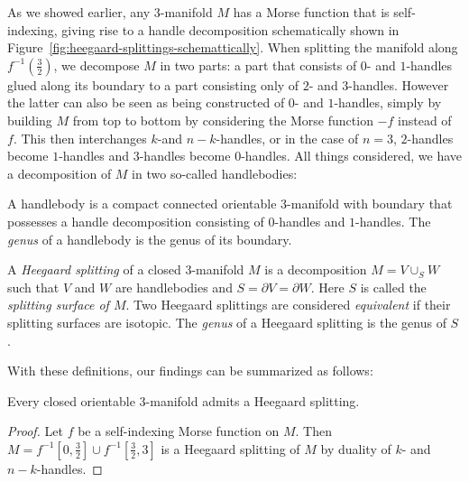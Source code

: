 As we showed earlier, any $3$-manifold $M$ has a Morse function that is self-indexing, giving rise to a handle decomposition schematically shown in Figure~\ref{fig:heegaard-splittings-schemattically}. When splitting the manifold along $f^{-1}(\frac{3}{2})$, we decompose $M$ in two parts: a part that consists of $0$- and $1$-handles glued along its boundary to a part consisting only of $2$- and  $3$-handles.
However the latter can also be seen as being constructed of $0$- and $1$-handles, simply by building $M$ from top to bottom by considering the Morse function $-f$ instead of $f$. This then interchanges $k$-and $n-k$-handles, or in the case of $n=3$, $2$-handles  become $1$-handles and $3$-handles become $0$-handles.
All things considered, we have a decomposition of $M$ in two so-called handlebodies:
\begin{definition}
    A handlebody is a compact connected orientable $3$-manifold with boundary that possesses a handle decomposition consisting of $0$-handles and $1$-handles. The \emph{genus} of a handlebody is the genus of its boundary.
\end{definition}
\begin{definition}
    A \emph{Heegaard splitting} of a closed $3$-manifold $M$ is a decomposition $M = V \cup _S W$ such that $V$ and $W$ are handlebodies and  $S = \partial V = \partial W$. Here  $S$ is called the \emph{splitting surface of $M$}.
    Two Heegaard splittings are considered \emph{equivalent} if their splitting surfaces are isotopic. The \emph{genus} of a Heegaard splitting is the genus of $S$.
\end{definition}

With these definitions, our findings can be summarized as follows:
\begin{theorem}
    Every closed orientable $3$-manifold admits a Heegaard splitting.
\end{theorem}
\begin{proof}
    Let $f$ be a self-indexing Morse function on $M$.
    Then $M = f^{-1}\left[0, \tfrac{3}{2}\right] \cup f^{-1}\left[\tfrac{3}{2}, 3\right]$ is a Heegaard splitting of $M$ by duality of $k$- and $n-k$-handles.
\end{proof}


